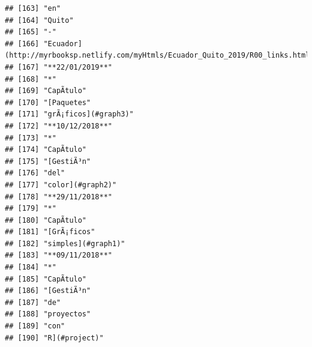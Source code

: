 \documentclass[
]{book}
\begin{document}
\begin{verbatim}
## [163] "en"                                                                               
## [164] "Quito"                                                                            
## [165] "-"                                                                                
## [166] "Ecuador](http://myrbooksp.netlify.com/myHtmls/Ecuador_Quito_2019/R00_links.html)" 
## [167] "**22/01/2019**"                                                                   
## [168] "*"                                                                                
## [169] "CapÃ­tulo"                                                                        
## [170] "[Paquetes"                                                                        
## [171] "grÃ¡ficos](#graph3)"                                                              
## [172] "**10/12/2018**"                                                                   
## [173] "*"                                                                                
## [174] "CapÃ­tulo"                                                                        
## [175] "[GestiÃ³n"                                                                        
## [176] "del"                                                                              
## [177] "color](#graph2)"                                                                  
## [178] "**29/11/2018**"                                                                   
## [179] "*"                                                                                
## [180] "CapÃ­tulo"                                                                        
## [181] "[GrÃ¡ficos"                                                                       
## [182] "simples](#graph1)"                                                                
## [183] "**09/11/2018**"                                                                   
## [184] "*"                                                                                
## [185] "CapÃ­tulo"                                                                        
## [186] "[GestiÃ³n"                                                                        
## [187] "de"                                                                               
## [188] "proyectos"                                                                        
## [189] "con"                                                                              
## [190] "R](#project)"                                                                     

\end{verbatim}
\end{document}
